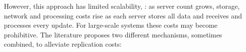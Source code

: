 However, this approach has limited scalability, \cite{sipre,eiger}: as server count grows, storage, network and processing costs rise as each server stores all data and receives and processes every update.
For large-scale systems these costs may become %
prohibitive.
The literature proposes two different mechanisms, sometimes combined, to alleviate replication costs:





